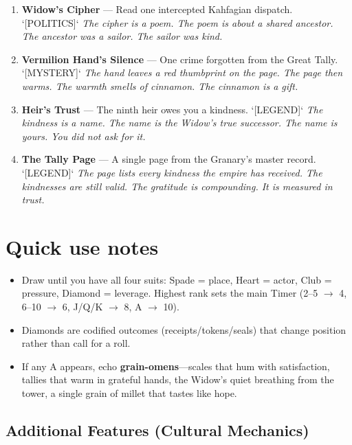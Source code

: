 \begin{enumerate}
  \hfill \textit{The witness is a scar on your arm. The scar is the chief's signature. The signature reads ``remember.''}
\item[J] \textbf{Widow's Cipher} --- Read one intercepted Kahfagian dispatch. `[POLITICS]`
  \hfill \textit{The cipher is a poem. The poem is about a shared ancestor. The ancestor was a sailor. The sailor was kind.}
\item[Q] \textbf{Vermilion Hand's Silence} --- One crime forgotten from the Great Tally. `[MYSTERY]`
  \hfill \textit{The hand leaves a red thumbprint on the page. The page then warms. The warmth smells of cinnamon. The cinnamon is a gift.}
\item[K] \textbf{Heir's Trust} --- The ninth heir owes you a kindness. `[LEGEND]`
  \hfill \textit{The kindness is a name. The name is the Widow's true successor. The name is yours. You did not ask for it.}
\item[A] \textbf{The Tally Page} --- A single page from the Granary's master record. `[LEGEND]`
  \hfill \textit{The page lists every kindness the empire has received. The kindnesses are still valid. The gratitude is compounding. It is measured in trust.}
\end{enumerate}

\section*{Quick use notes}
\label{sec:oshiira-quick-use}
\begin{itemize}
\item Draw until you have all four suits: Spade = place, Heart = actor, Club = pressure, Diamond = leverage. Highest rank sets the main Timer (2--5 $\rightarrow$ 4, 6--10 $\rightarrow$ 6, J/Q/K $\rightarrow$ 8, A $\rightarrow$ 10).
\item Diamonds are codified outcomes (receipts/tokens/seals) that change position rather than call for a roll.
\item If any A appears, echo \textbf{grain-omens}---scales that hum with satisfaction, tallies that warm in grateful hands, the Widow's quiet breathing from the tower, a single grain of millet that tastes like hope.
\end{itemize}

\subsection*{Additional Features (Cultural Mechanics)}
\label{sec:oshiira-mechanics}

